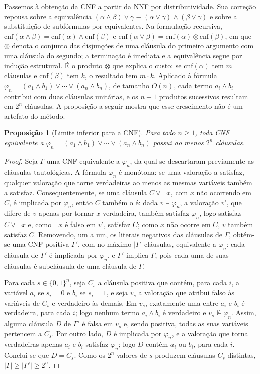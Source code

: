 \documentclass[12pt,a4paper,oneside]{report}
\theoremstyle{tituloplain}
\newtheorem{proposicao}[teorema]{Proposição}
\theoremstyle{titulodef}
\begin{document}
Passemos à obtenção da CNF a partir da NNF por distributividade. Sua correção repousa sobre a equivalência $(\alpha\wedge\beta)\vee\gamma\equiv(\alpha\vee\gamma)\wedge(\beta\vee\gamma)$ e sobre a substituição de subfórmulas por equivalentes. Na formulação recursiva, $\mathrm{cnf}(\alpha\wedge\beta)=\mathrm{cnf}(\alpha)\wedge\mathrm{cnf}(\beta)$ e $\mathrm{cnf}(\alpha\vee\beta)=\mathrm{cnf}(\alpha)\otimes\mathrm{cnf}(\beta)$, em que $\otimes$ denota o conjunto das disjunções de uma cláusula do primeiro argumento com uma cláusula do segundo; a terminação é imediata e a equivalência segue por indução estrutural. É o produto $\otimes$ que explica o custo: se $\mathrm{cnf}(\alpha)$ tem $m$ cláusulas e $\mathrm{cnf}(\beta)$ tem $k$, o resultado tem $m\cdot k$. Aplicado à fórmula $\varphi_n=(a_1\wedge b_1)\vee\cdots\vee(a_n\wedge b_n)$, de tamanho $O(n)$, cada termo $a_i\wedge b_i$ contribui com duas cláusulas unitárias, e os $n-1$ produtos sucessivos resultam em $2^n$ cláusulas. A proposição a seguir mostra que esse crescimento não é um artefato do método.
 
\begin{proposicao}[Limite inferior para a CNF]\label{prop:limite-cnf}
Para todo $n\geq 1$, toda CNF equivalente a $\varphi_n=(a_1\wedge b_1)\vee\cdots\vee(a_n\wedge b_n)$ possui ao menos $2^n$ cláusulas.
\end{proposicao}
\begin{proof}
Seja $\Gamma$ uma CNF equivalente a $\varphi_n$, da qual se descartaram previamente as cláusulas tautológicas. A fórmula $\varphi_n$ é monótona: se uma valoração a satisfaz, qualquer valoração que torne verdadeiras ao menos as mesmas variáveis também a satisfaz. Consequentemente, se uma cláusula $C\vee\neg x$, com $x$ não ocorrendo em $C$, é implicada por $\varphi_n$, então $C$ também o é: dada $v\models\varphi_n$, a valoração $v'$, que difere de $v$ apenas por tornar $x$ verdadeira, também satisfaz $\varphi_n$, logo satisfaz $C\vee\neg x$ e, como $\neg x$ é falso em $v'$, satisfaz $C$; como $x$ não ocorre em $C$, $v$ também satisfaz $C$. Removendo, um a um, os literais negativos das cláusulas de $\Gamma$, obtém-se uma CNF positiva $\Gamma'$, com no máximo $|\Gamma|$ cláusulas, equivalente a $\varphi_n$: cada cláusula de $\Gamma'$ é implicada por $\varphi_n$, e $\Gamma'$ implica $\Gamma$, pois cada uma de suas cláusulas é subcláusula de uma cláusula de $\Gamma$.
 
Para cada $s\in\{0,1\}^n$, seja $C_s$ a cláusula positiva que contém, para cada $i$, a variável $a_i$ se $s_i=0$ e $b_i$ se $s_i=1$, e seja $v_s$ a valoração que atribui falso às variáveis de $C_s$ e verdadeiro às demais. Em $v_s$, exatamente uma entre $a_i$ e $b_i$ é verdadeira, para cada $i$; logo nenhum termo $a_i\wedge b_i$ é verdadeiro e $v_s\not\models\varphi_n$. Assim, alguma cláusula $D$ de $\Gamma'$ é falsa em $v_s$ e, sendo positiva, todas as suas variáveis pertencem a $C_s$. Por outro lado, $D$ é implicada por $\varphi_n$, e a valoração que torna verdadeiras apenas $a_i$ e $b_i$ satisfaz $\varphi_n$; logo $D$ contém $a_i$ ou $b_i$, para cada $i$. Conclui-se que $D=C_s$. Como os $2^n$ valores de $s$ produzem cláusulas $C_s$ distintas, $|\Gamma|\geq|\Gamma'|\geq 2^n$.
\end{proof}
 
\end{document}
